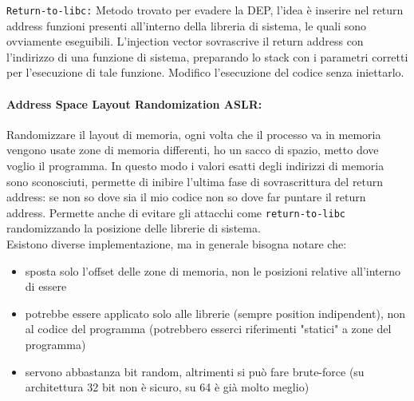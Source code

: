 \texttt{Return-to-libc:} Metodo trovato per evadere la DEP, l'idea è inserire nel return address funzioni presenti all'interno della libreria di sistema, le quali sono ovviamente eseguibili. L'injection vector sovrascrive il return address con l'indirizzo di una funzione di sistema, preparando lo stack con i parametri corretti per l'esecuzione di tale funzione. Modifico l'esecuzione del codice senza iniettarlo.\\

\paragraph{Address Space Layout Randomization ASLR:} Randomizzare il layout di memoria, ogni volta che il processo va in memoria vengono usate zone di memoria differenti, ho un sacco di spazio, metto dove voglio il programma. In questo modo i valori esatti degli indirizzi di memoria sono sconosciuti, permette di inibire l'ultima fase di sovrascrittura del return address: se non so dove sia il mio codice non so dove far puntare il return address. Permette anche di evitare gli attacchi come \texttt{return-to-libc} randomizzando la posizione delle librerie di sistema.\\

Esistono diverse implementazione, ma in generale bisogna notare che:
\begin{itemize}
	\item sposta solo l'offset delle zone di memoria, non le posizioni relative all'interno di essere
	\item potrebbe essere applicato solo alle librerie (sempre position indipendent), non al codice del programma (potrebbero esserci riferimenti "statici" a zone del programma)
	\item servono abbastanza bit random, altrimenti si può fare brute-force (su architettura 32 bit non è sicuro, su 64 è già molto meglio)
\end{itemize}

